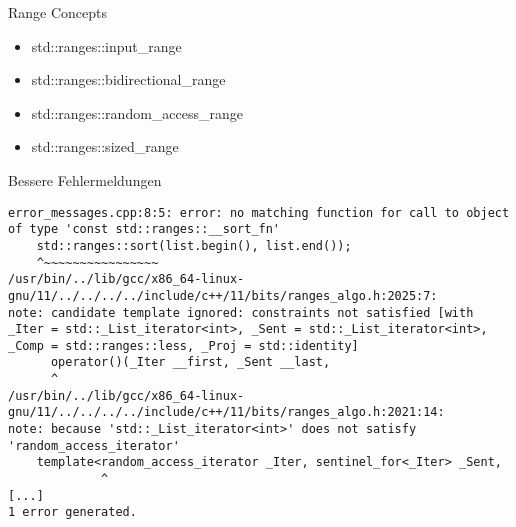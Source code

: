 \begin{frame}[fragile]{Range Concepts}
\begin{itemize}
    \item<1-> std::ranges::input\_range
    \item<3-> std::ranges::bidirectional\_range
    \item<4-> std::ranges::random\_access\_range
    \item<5-> std::ranges::sized\_range
\end{itemize}
\end{frame}

\begin{frame}[fragile]{Bessere Fehlermeldungen}
\begin{verbatim}
error_messages.cpp:8:5: error: no matching function for call to object of type 'const std::ranges::__sort_fn'
    std::ranges::sort(list.begin(), list.end());
    ^~~~~~~~~~~~~~~~~
/usr/bin/../lib/gcc/x86_64-linux-gnu/11/../../../../include/c++/11/bits/ranges_algo.h:2025:7:
note: candidate template ignored: constraints not satisfied [with _Iter = std::_List_iterator<int>, _Sent = std::_List_iterator<int>, _Comp = std::ranges::less, _Proj = std::identity]
      operator()(_Iter __first, _Sent __last,
      ^
/usr/bin/../lib/gcc/x86_64-linux-gnu/11/../../../../include/c++/11/bits/ranges_algo.h:2021:14:
note: because 'std::_List_iterator<int>' does not satisfy 'random_access_iterator'
    template<random_access_iterator _Iter, sentinel_for<_Iter> _Sent,
             ^
[...]
1 error generated.

\end{verbatim}
\end{frame}